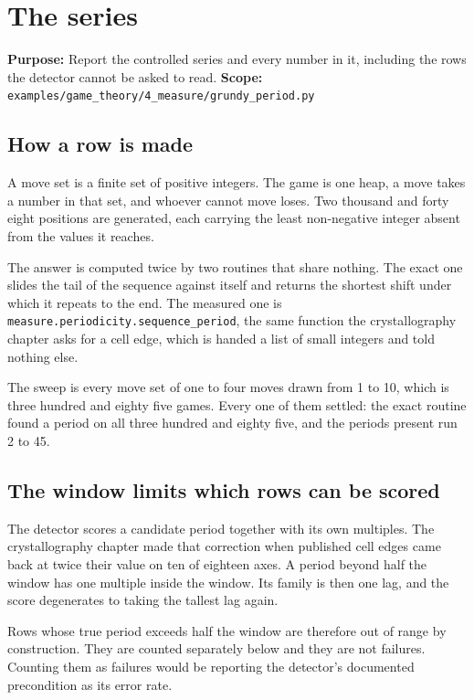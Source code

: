 \chapter{The series}

\textbf{Purpose:} Report the controlled series and every number in it, including the rows the
detector cannot be asked to read. \textbf{Scope:}
\texttt{examples/\allowbreak{}game\_\allowbreak{}theory/\allowbreak{}4\_\allowbreak{}measure/\allowbreak{}grundy\_\allowbreak{}period.\allowbreak{}py}

\section{How a row is made}

A move set is a finite set of positive integers. The game is one heap, a move takes a number in that
set, and whoever cannot move loses. Two thousand and forty eight positions are generated, each
carrying the least non-negative integer absent from the values it reaches.

The answer is computed twice by two routines that share nothing. The exact one slides the tail of
the sequence against itself and returns the shortest shift under which it repeats to the end. The
measured one is \texttt{measure.\allowbreak{}periodicity.\allowbreak{}sequence\_\allowbreak{}period},
the same function the crystallography chapter asks for a cell edge, which is handed a list of small
integers and told nothing else.

The sweep is every move set of one to four moves drawn from 1 to 10, which is three hundred and
eighty five games. Every one of them settled: the exact routine found a period on all three hundred
and eighty five, and the periods present run 2 to 45.

\section{The window limits which rows can be scored}

The detector scores a candidate period together with its own multiples. The crystallography chapter
made that correction when published cell edges came back at twice their value on ten of eighteen
axes. A period beyond half the window has one multiple inside the window. Its family is then one lag,
and the score degenerates to taking the tallest lag again.

Rows whose true period exceeds half the window are therefore out of range by construction. They are
counted separately below and they are not failures. Counting them as failures would be reporting the
detector's documented precondition as its error rate.

